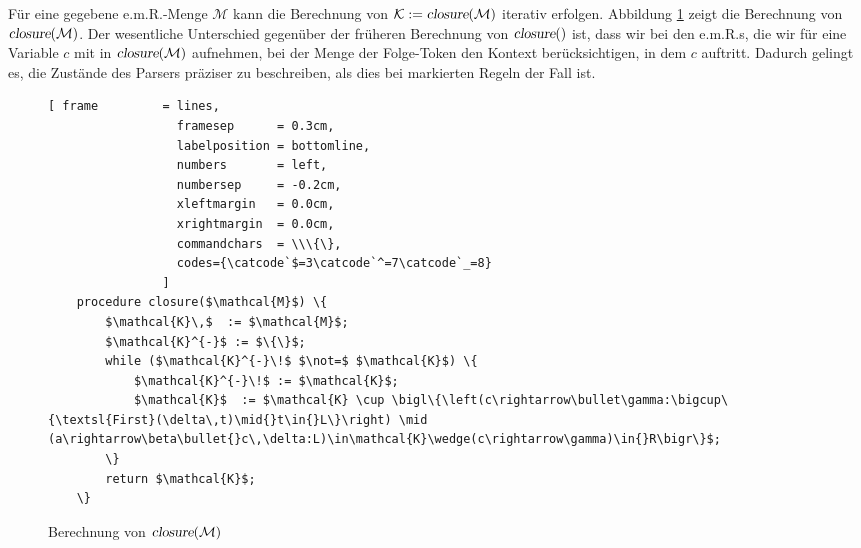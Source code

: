 F\"ur eine gegebene e.m.R.-Menge $\mathcal{M}$ kann die Berechnung von 
$\mathcal{K} := \textsl{closure}(\mathcal{M})$ iterativ erfolgen.  Abbildung \ref{fig:closure} zeigt die
Berechnung von $\textsl{closure}(\mathcal{M})$.  Der wesentliche Unterschied gegen\"uber der
fr\"uheren Berechnung von $\textsl{closure}()$ ist, dass wir bei den e.m.R.s, die wir f\"ur
eine Variable $c$ mit in $\textsl{closure}(\mathcal{M})$ aufnehmen, bei der Menge der
Folge-Token den Kontext ber\"ucksichtigen, in dem $c$ auftritt.
Dadurch gelingt es,  die Zust\"ande des Parsers pr\"aziser zu beschreiben, als dies bei
markierten Regeln der Fall ist.

\begin{figure}[!ht]
\centering
\begin{Verbatim}[ frame         = lines, 
                  framesep      = 0.3cm, 
                  labelposition = bottomline,
                  numbers       = left,
                  numbersep     = -0.2cm,
                  xleftmargin   = 0.0cm,
                  xrightmargin  = 0.0cm,
                  commandchars  = \\\{\},
                  codes={\catcode`$=3\catcode`^=7\catcode`_=8}
                ]
    procedure closure($\mathcal{M}$) \{
        $\mathcal{K}\,$  := $\mathcal{M}$;
        $\mathcal{K}^{-}$ := $\{\}$;
        while ($\mathcal{K}^{-}\!$ $\not=$ $\mathcal{K}$) \{
            $\mathcal{K}^{-}\!$ := $\mathcal{K}$;
            $\mathcal{K}$  := $\mathcal{K} \cup \bigl\{\left(c\rightarrow\bullet\gamma:\bigcup\{\textsl{First}(\delta\,t)\mid{}t\in{}L\}\right) \mid (a\rightarrow\beta\bullet{}c\,\delta:L)\in\mathcal{K}\wedge(c\rightarrow\gamma)\in{}R\bigr\}$;
        \}
        return $\mathcal{K}$;
    \}
\end{Verbatim}
\vspace*{-0.3cm}
\caption{Berechnung von $\textsl{closure}(\mathcal{M})$}
\label{fig:closure}
\end{figure}
\vspace*{0.2cm}


